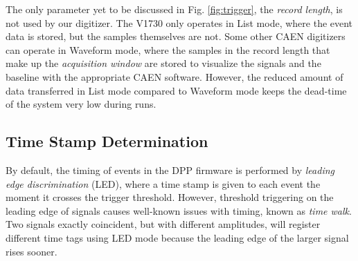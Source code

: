 The only parameter yet to be discussed in Fig. \ref{fig:trigger}, the \emph{record length}, is not used by our digitizer. The V1730 only operates in List mode, where the event data is stored, but the samples themselves are not. Some other CAEN digitizers can operate in Waveform mode, where the samples in the record length that make up the \emph{acquisition window} are stored to visualize the signals and the baseline with the appropriate CAEN software. However, the reduced amount of data transferred in List mode compared to Waveform mode keeps the dead-time of the system very low during runs.

\subsection{Time Stamp Determination} \label{subsec:time_stamp}


By default, the timing of events in the DPP firmware is performed by \emph{leading edge discrimination} (LED), where a time stamp is given to each event the moment it crosses the trigger threshold. However, threshold triggering on the leading edge of signals causes well-known issues with timing, known as \emph{time walk}. Two signals exactly coincident, but with different amplitudes, will register different time tags using LED mode because the leading edge of the larger signal rises sooner. 


